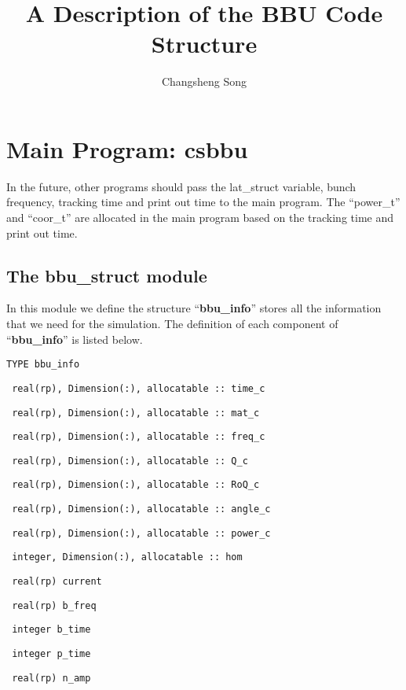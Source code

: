 \documentclass[12pt]{article}
\begin{document}
\title{A Description of the BBU Code Structure}

\author{Changsheng Song}

\maketitle



\section{Main Program: csbbu}

In the future, other programs should pass the lat\_struct variable, bunch frequency, tracking time
and print out time to the main program. The ``power\_t'' and ``coor\_t'' are allocated in the main
program based on the tracking time and print out time.


\subsection{The bbu\_struct module}

In this module we define the structure ``{\bf bbu\_info}'' stores all the information that we need for the simulation.
The definition of each component of ``{\bf bbu\_info}'' is listed below.

\texttt{TYPE bbu\_info}

\texttt{  real(rp), Dimension(:), allocatable :: time\_c}  

\texttt{  real(rp), Dimension(:), allocatable :: mat\_c}

\texttt{  real(rp), Dimension(:), allocatable :: freq\_c}

\texttt{  real(rp), Dimension(:), allocatable :: Q\_c}

\texttt{  real(rp), Dimension(:), allocatable :: RoQ\_c}

\texttt{  real(rp), Dimension(:), allocatable :: angle\_c}

\texttt{  real(rp), Dimension(:), allocatable :: power\_c}

\texttt{  integer,  Dimension(:), allocatable ::   hom}

\texttt{  real(rp)  current}

\texttt{  real(rp)  b\_freq}

\texttt{  integer   b\_time}

\texttt{  integer   p\_time}

\texttt{  real(rp)  n\_amp}
\end{document}
